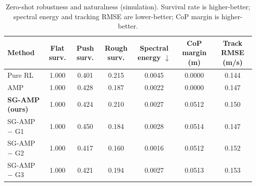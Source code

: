 \begin{table}[t]
  \centering
  \caption{Zero-shot robustness and naturalness (simulation). Survival rate is higher-better; spectral energy and tracking RMSE are lower-better; CoP margin is higher-better.}
  \label{tab:results}
  \begin{tabular}{lcccccc}
    \toprule
    Method & Flat surv. & Push surv. & Rough surv. & Spectral energy $\downarrow$ & CoP margin (m) & Track RMSE (m/s) \\
    \midrule
    Pure RL & 1.000 & 0.401 & 0.215 & 0.0045 & 0.0000 & 0.144 \\
    AMP & 1.000 & 0.428 & 0.187 & 0.0022 & 0.0000 & 0.147 \\
    \textbf{SG-AMP (ours)} & 1.000 & 0.424 & 0.210 & 0.0027 & 0.0512 & 0.150 \\
    SG-AMP $-$ G1 & 1.000 & 0.450 & 0.184 & 0.0028 & 0.0514 & 0.147 \\
    SG-AMP $-$ G2 & 1.000 & 0.417 & 0.160 & 0.0016 & 0.0512 & 0.152 \\
    SG-AMP $-$ G3 & 1.000 & 0.421 & 0.194 & 0.0027 & 0.0513 & 0.153 \\
    \bottomrule
  \end{tabular}
\end{table}
